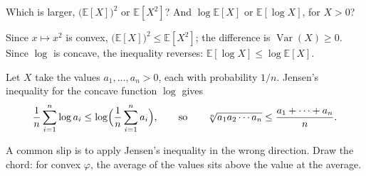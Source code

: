 \documentclass[11pt]{article}
\begin{document}
\begin{question}
Which is larger, $\bigl(\mathbb{E}[X]\bigr)^2$ or $\mathbb{E}[X^2]$? And
$\log \mathbb{E}[X]$ or $\mathbb{E}[\log X]$, for $X > 0$?
\end{question}

\begin{answer}
Since $x \mapsto x^2$ is convex, $\bigl(\mathbb{E}[X]\bigr)^2 \le \mathbb{E}[X^2]$;
the difference is $\operatorname{Var}(X) \ge 0$. Since $\log$ is concave,
the inequality reverses: $\mathbb{E}[\log X] \le \log \mathbb{E}[X]$.
\end{answer}

\begin{example}
Let $X$ take the values $a_1, \dots, a_n > 0$, each with probability $1/n$.
Jensen's inequality for the concave function $\log$ gives
\[
    \frac{1}{n}\sum_{i=1}^n \log a_i \le \log\Bigl(\frac{1}{n}\sum_{i=1}^n a_i\Bigr),
    \qquad\text{so}\qquad
    \sqrt[n]{a_1 a_2 \cdots a_n} \le \frac{a_1 + \cdots + a_n}{n}.
\]
\end{example}

\begin{remark}
A common slip is to apply Jensen's inequality in the wrong direction. Draw
the chord: for convex $\varphi$, the average of the values sits above the
value at the average.
\end{remark}
\end{document}
